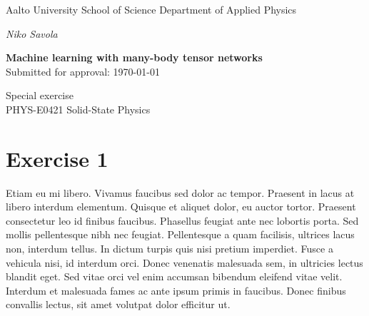 

\lfoot{}
\cfoot{}
\rfoot{\thepage}





\begin{titlepage}
    {\sffamily
    \noindent
    \fontsize{12}{14}\selectfont
    Aalto University \newline
    School of Science \newline
    Department of Applied Physics

    \vspace{40mm}

    \noindent
    \fontsize{14}{16}\selectfont
    \emph{Niko Savola}

    \vspace{10mm}

    \noindent
    \fontsize{18}{22}\selectfont
    \textbf{Machine learning with many-body tensor networks}\\

    \fontsize{12}{14}\selectfont
    \noindent
    Submitted for approval: \today

    \vspace{70mm}

    \noindent
    Special exercise \\[4mm]
    PHYS-E0421 \textendash{} Solid-State Physics \\[4mm]
    } %

\end{titlepage}
\newpage


\section*{Exercise 1}

Etiam eu mi libero. Vivamus faucibus sed dolor ac tempor. Praesent in lacus at libero interdum elementum. Quisque et aliquet dolor, eu auctor tortor. Praesent consectetur leo id finibus faucibus. Phasellus feugiat ante nec lobortis porta. Sed mollis pellentesque nibh nec feugiat. Pellentesque a quam facilisis, ultrices lacus non, interdum tellus. In dictum turpis quis nisi pretium imperdiet. Fusce a vehicula nisi, id interdum orci. Donec venenatis malesuada sem, in ultricies lectus blandit eget. Sed vitae orci vel enim accumsan bibendum eleifend vitae velit. Interdum et malesuada fames ac ante ipsum primis in faucibus. Donec finibus convallis lectus, sit amet volutpat dolor efficitur ut.

\cite{Roberts2019}



\newpage
\pagestyle{plain}
\renewcommand*{\bibfont}{\footnotesize}
\printbibliography{}



